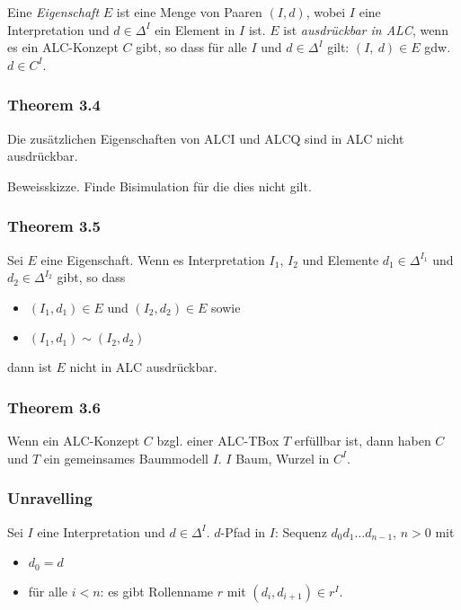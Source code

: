 Eine \emph{Eigenschaft} $E$ ist eine Menge von Paaren $(I,d)$, wobei
$I$ eine Interpretation und $d \in \Delta^{I}$ ein Element in $I$
ist. $E$ ist \emph{ausdrückbar in ALC}, wenn es ein ALC-Konzept $C$
gibt, so dass für alle $I$ und $d \in \Delta^{I}$ gilt:
$\left( I,\ d \right) \in E$ gdw. $d \in C^{I}$.

\subsubsection{Theorem 3.4}\label{theorem-3.4}

Die zusätzlichen Eigenschaften von ALCI und ALCQ sind in ALC nicht
ausdrückbar.

Beweisskizze. Finde Bisimulation für die dies nicht gilt.

\subsubsection{Theorem 3.5}\label{theorem-3.5}

Sei $E$ eine Eigenschaft. Wenn es Interpretation $I_{1}$, $I_{2}$
und Elemente $d_{1} \in \Delta^{I_{1}}$ und
$d_{2} \in \Delta^{I_{2}}$ gibt, so dass

\begin{itemize}
\item
  $\left( I_{1},d_{1} \right) \in E$ und
  $\left( I_{2},d_{2} \right) \in E$ sowie
\item
  $(I_{1},d_{1}) \sim (I_{2},d_{2})$
\end{itemize}

dann ist $E$ nicht in ALC ausdrückbar.

\subsubsection{Theorem 3.6}\label{theorem-3.6}

Wenn ein ALC-Konzept $C$ bzgl. einer ALC-TBox $T$ erfüllbar ist,
dann haben $C$ und $T$ ein gemeinsames Baummodell $I$. $I$ Baum,
Wurzel in $C^{I}$.

\subsubsection{Unravelling}\label{unravelling}

Sei $I$ eine Interpretation und $d \in \Delta^{I}$. $d$-Pfad in
$I$: Sequenz $d_{0}d_{1}\ldots d_{n - 1}$, $n > 0$ mit

\begin{itemize}
\item
  $d_{0} = d$
\item
  für alle $i < n$: es gibt Rollenname $r$ mit
  $\left( d_{i},d_{i + 1} \right) \in r^{I}$.
\end{itemize}


